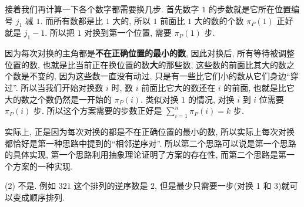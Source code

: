 \begin{solution}
接着我们再计算一下各个数字都需要换几步. 首先数字 $1$ 的步数就是它所在位置编号 $j_1$ 减 $1$. 而所有数都是比 $1$ 大的, 所以 $1$ 前面比 $1$ 大的数的个数 $\pi_{P}(1)$ 正好就是 $j_1 - 1$. 所以把 $1$ 对换到第一个位置, 需要 $\pi_{P}(1)$ 步.

因为每次对换的主角都是\textbf{不在正确位置的最小的数}, 因此对换后, 所有等待被调整位置的数, 也就是比当前正在换位置的数\textbf{大}的那些数, 这些数的前面比其大的数之个数是不变的, 因为这些数一直没有动过, 只是有一些比它们小的数从它们身边``穿过''. 所以当我们开始对换数 $i$ 时, 数 $i$ 前面比它大的数还在 $i$ 的前面, 也就是比它大的数之个数仍然是一开始的 $\pi_{P}(i)$. 类似对换 $1$ 的情况, 对换 $i$ 到 $i$ 位需要 $\pi_{P}(i)$ 步. 所以这个方案需要的步数正好是 $\sum_{i = 1}^{n} \pi_{P}(i) = k$ 步.
    
实际上, 正是因为每次对换的都是不在正确位置的最小的数, 所以实际上每次对换都恰好是第一种思路中提到的``相邻逆序对''. 所以第二个思路可以说是第一个思路的具体实现, 第一个思路利用抽象理论证明了方案的存在性, 而第二个思路是第一个方案的一种实现.

(2) 不是. 例如 $321$ 这个排列的逆序数是 $2$, 但是最少只需要一步(对换 1 和 3)就可以变成顺序排列.   
\end{solution}